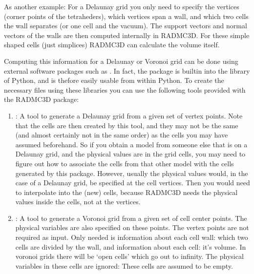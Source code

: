 \documentclass[letterpaper,10pt,english]{sphinxmanual}
\begin{document}
As another example: For a Delaunay grid you only need to specify the vertices
(corner points of the tetraheders), which vertices span a wall, and which two
cells the wall separates (or one cell and the vacuum). The support vectors and
normal vectors of the walls are then computed internally in RADMC\sphinxhyphen{}3D.
For these simple shaped cells (just simplices) RADMC\sphinxhyphen{}3D can calculate the volume
itself.

Computing this information for a Delaunay or Voronoi grid can be done using
external software packages such as . In fact, the  package
is built\sphinxhyphen{}in into the  library of Python, and is thefore
easily usable from within Python. To create the necessary 
files using these libraries you can use the following tools provided with
the RADMC\sphinxhyphen{}3D package:
\begin{enumerate}
%
\item {} 
 : A tool to generate a
Delaunay grid from a given set of vertex points. Note that the cells are
then created by this tool, and they may not be the same (and almost certainly
not in the same order) as the cells you may have assumed beforehand. So
if you obtain a model from someone else that is on a Delaunay grid, and
the physical values are in the grid cells, you may need to figure out how
to associate the cells from that other model with the cells generated by
this package. However, usually the physical values would, in the case of
a Delaunay grid, be specified at the cell vertices. Then you would need
to interpolate into the (new) cells, because RADMC\sphinxhyphen{}3D needs the physical
values inside the cells, not at the vertices.

\item {} 
 : A tool to generate
a Voronoi grid from a given set of cell center points. The physical
variables are also specified on these points. The vertex points are
not required as input. Only needed is information about each cell wall:
which two cells are divided by the wall, and information about each cell:
it’s volume. In voronoi grids there will be ‘open cells’ which go out
to infinity. The physical variables in these cells are ignored: These
cells are assumed to be empty.

\end{enumerate}
\end{document}
